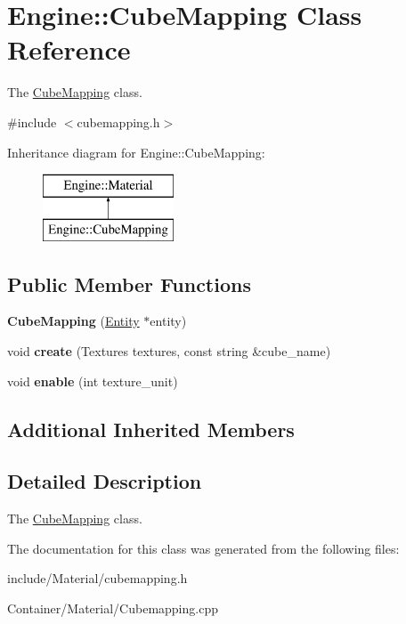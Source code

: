 \hypertarget{classEngine_1_1CubeMapping}{}\section{Engine\+:\+:Cube\+Mapping Class Reference}
\label{classEngine_1_1CubeMapping}


The \hyperlink{classEngine_1_1CubeMapping}{Cube\+Mapping} class.  




{\ttfamily \#include $<$cubemapping.\+h$>$}

Inheritance diagram for Engine\+:\+:Cube\+Mapping\+:\begin{figure}[H]
\begin{center}
\leavevmode
\includegraphics[height=2.000000cm]{classEngine_1_1CubeMapping}
\end{center}
\end{figure}
\subsection*{Public Member Functions}
\begin{DoxyCompactItemize}
\item 
\hypertarget{classEngine_1_1CubeMapping_abe5d082c7149004faf7fb15503805770}{}{\bfseries Cube\+Mapping} (\hyperlink{classEngine_1_1Entity}{Entity} $\ast$entity)\label{classEngine_1_1CubeMapping_abe5d082c7149004faf7fb15503805770}

\item 
\hypertarget{classEngine_1_1CubeMapping_aae33bd91f464a7ecef5c22d598e9da50}{}void {\bfseries create} (Textures textures, const string \&cube\+\_\+name)\label{classEngine_1_1CubeMapping_aae33bd91f464a7ecef5c22d598e9da50}

\item 
\hypertarget{classEngine_1_1CubeMapping_a8dec1352f578bcdc470b4c468c216624}{}void {\bfseries enable} (int texture\+\_\+unit)\label{classEngine_1_1CubeMapping_a8dec1352f578bcdc470b4c468c216624}

\end{DoxyCompactItemize}
\subsection*{Additional Inherited Members}


\subsection{Detailed Description}
The \hyperlink{classEngine_1_1CubeMapping}{Cube\+Mapping} class. 

The documentation for this class was generated from the following files\+:\begin{DoxyCompactItemize}
\item 
include/\+Material/cubemapping.\+h\item 
Container/\+Material/Cubemapping.\+cpp\end{DoxyCompactItemize}
